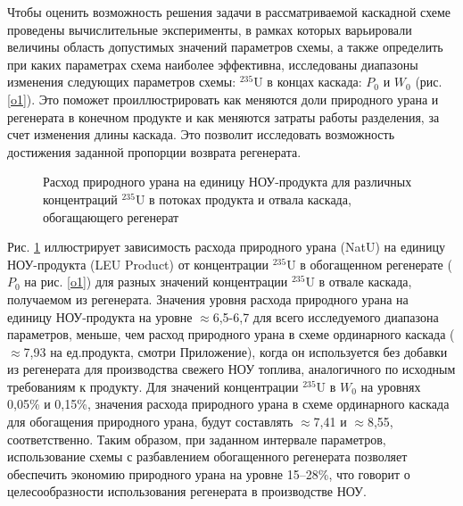 Чтобы оценить возможность решения задачи в рассматриваемой каскадной схеме проведены вычислительные эксперименты, в рамках которых варьировали величины область допустимых значений параметров схемы, а также определить при каких параметрах схема наиболее эффективна, исследованы диапазоны изменения следующих параметров схемы: $^{235}$U в концах каскада: $P_0$ и $W_0$ (рис. \ref{o1}). Это поможет проиллюстрировать как меняются доли природного урана и регенерата в конечном продукте и как меняются затраты работы разделения, за счет изменения длины каскада. Это позволит исследовать возможность достижения заданной пропорции возврата регенерата. 

\begin{figure}[ht]
  \caption{Расход природного урана на единицу НОУ-продукта  для различных концентраций $^{235}$U в потоках продукта и отвала каскада, обогащающего регенерат}\label{fig:sc2_2}
\end{figure}

Рис. \ref{fig:sc2_2} иллюстрирует зависимость расхода природного урана (NatU) на единицу НОУ-продукта (LEU Product) от концентрации $^{235}$U в обогащенном регенерате ($P_0$ на рис. \ref{o1}) для разных значений концентрации $^{235}$U в отвале каскада, получаемом из регенерата. Значения уровня расхода природного урана на единицу НОУ-продукта на уровне $\approx$6,5-6,7 для всего исследуемого диапазона параметров, меньше, чем расход природного урана в схеме ординарного каскада ($\approx$7,93 на ед.продукта, смотри Приложение), когда он используется без добавки из регенерата для производства свежего НОУ топлива, аналогичного по исходным требованиям к продукту. Для значений концентрации $^{235}$U в $W_0$ на уровнях 0,05\% и 0,15\%, значения расхода природного урана в схеме ординарного каскада для обогащения природного урана, будут составлять $\approx$7,41 и $\approx$8,55, соответственно. Таким образом, при заданном интервале параметров, использование схемы с разбавлением обогащенного регенерата позволяет обеспечить экономию природного урана на уровне 15--28\%, что говорит о целесообразности использования регенерата в производстве НОУ.

